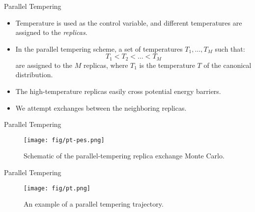 \documentclass[10pt]{beamer}
\begin{document}
\begin{frame}{Parallel Tempering}
\begin{itemize}
\setlength\itemsep{1em}
  \item Temperature is used as the control variable, and different temperatures are assigned to the \textit{replicas}.

  \item In the parallel tempering scheme, a set of temperatures $T_1,\dots,T_M$ such that:
  \begin{equation}
    T_1 < T_2 < \dots < T_M
  \end{equation}
  are assigned to the $M$ replicas, where $T_1$ is the temperature $T$ of the canonical distribution.

  \item The high-temperature replicas easily cross potential energy barriers.

  \item We attempt exchanges between the neighboring replicas.
\end{itemize}
\end{frame}

\begin{frame}{Parallel Tempering}
\begin{figure}
  \texttt{[image: fig/pt-pes.png]}
  \caption{Schematic of the parallel-tempering replica exchange Monte Carlo.}
\end{figure}
\end{frame}

\begin{frame}{Parallel Tempering}
\begin{figure}
  \texttt{[image: fig/pt.png]}
  \caption{An example of a parallel tempering trajectory.}
\end{figure}
\end{frame}
\end{document}
